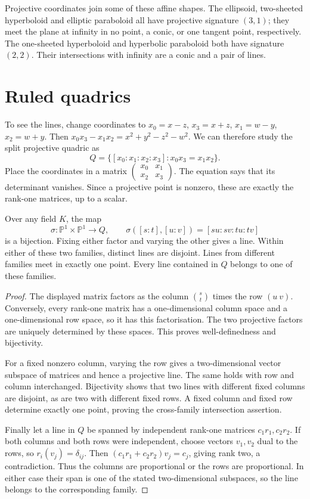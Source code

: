 Projective coordinates join some of these affine shapes. The ellipsoid,
two-sheeted hyperboloid and elliptic paraboloid all have projective
signature $(3,1)$; they meet the plane at infinity in no point, a conic,
or one tangent point, respectively. The one-sheeted hyperboloid and
hyperbolic paraboloid both have signature $(2,2)$. Their intersections
with infinity are a conic and a pair of lines.

\section{Ruled quadrics}\label{geometry:sec:ruled}

To see the lines, change coordinates to
$x_0=x-z$, $x_3=x+z$, $x_1=w-y$, $x_2=w+y$.
Then $x_0x_3-x_1x_2=x^2+y^2-z^2-w^2$.
We can therefore study the split projective quadric as
\[
 Q=\{[x_0:x_1:x_2:x_3]:x_0x_3=x_1x_2\}.
\]
Place the coordinates in a matrix
$\left(\begin{smallmatrix}x_0&x_1\\x_2&x_3\end{smallmatrix}\right)$.
The equation says that its determinant vanishes. Since a projective point
is nonzero, these are exactly the rank-one matrices, up to a scalar.

\begin{theorem}\label{geometry:thm:segre}
Over any field $K$, the map
\[
 \sigma:\mathbb P^1\times\mathbb P^1\longrightarrow Q,\qquad
 \sigma([s:t],[u:v])=[su:sv:tu:tv]
\]
is a bijection. Fixing either factor and varying the other gives a line.
Within either of these two families, distinct lines are disjoint.
Lines from different families meet in exactly one point.
Every line contained in $Q$ belongs to one of these families.
\end{theorem}
\begin{proof}
The displayed matrix factors as the column $\binom st$ times the row
$(u\ v)$. Conversely, every rank-one matrix has a one-dimensional
column space and a one-dimensional row space, so it has this factorisation.
The two projective factors are uniquely determined by these spaces.
This proves well-definedness and bijectivity.

For a fixed nonzero column, varying the row gives a two-dimensional
vector subspace of matrices and hence a projective line. The same holds
with row and column interchanged. Bijectivity shows that two lines with
different fixed columns are disjoint, as are two with different fixed
rows. A fixed column and fixed row determine exactly one point, proving
the cross-family intersection assertion.

Finally let a line in $Q$ be spanned by independent rank-one matrices
$c_1r_1,c_2r_2$. If both columns and both rows were independent, choose
vectors $v_1,v_2$ dual to the rows, so $r_i(v_j)=\delta_{ij}$.
Then $(c_1r_1+c_2r_2)v_j=c_j$, giving rank two, a contradiction.
Thus the columns are proportional or the rows are proportional.
In either case their span is one of the stated two-dimensional subspaces,
so the line belongs to the corresponding family.
\end{proof}

